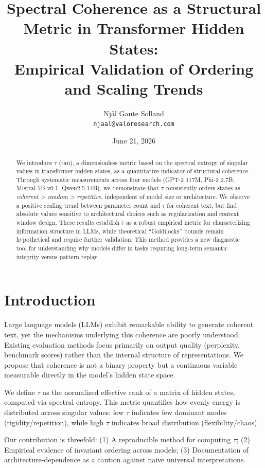\documentclass[10pt,a4paper]{article}
\title{Spectral Coherence as a Structural Metric in Transformer Hidden States: \\ Empirical Validation of Ordering and Scaling Trends}
\author{Njål Gaute Solland \\ \texttt{njaal@valoresearch.com}}
\date{June 21, 2026}
\begin{document}
\maketitle

\begin{abstract}
We introduce $\tau$ (tau), a dimensionless metric based on the spectral entropy of singular values in transformer hidden states, as a quantitative indicator of structural coherence. Through systematic measurements across four models (GPT-2 117M, Phi-2 2.7B, Mistral-7B v0.1, Qwen2.5-14B), we demonstrate that $\tau$ consistently orders states as \textit{coherent > random > repetitive}, independent of model size or architecture. We observe a positive scaling trend between parameter count and $\tau$ for coherent text, but find absolute values sensitive to architectural choices such as regularization and context window design. These results establish $\tau$ as a robust empirical metric for characterizing information structure in LLMs, while theoretical ``Goldilocks'' bounds remain hypothetical and require further validation. This method provides a new diagnostic tool for understanding why models differ in tasks requiring long-term semantic integrity versus pattern replay.
\end{abstract}

\section{Introduction}
Large language models (LLMs) exhibit remarkable ability to generate coherent text, yet the mechanisms underlying this coherence are poorly understood. Existing evaluation methods focus primarily on output quality (perplexity, benchmark scores) rather than the internal structure of representations. We propose that coherence is not a binary property but a continuous variable measurable directly in the model's hidden state space.

We define $\tau$ as the normalized effective rank of a matrix of hidden states, computed via spectral entropy. This metric quantifies how evenly energy is distributed across singular values: low $\tau$ indicates few dominant modes (rigidity/repetition), while high $\tau$ indicates broad distribution (flexibility/chaos).

Our contribution is threefold: (1) A reproducible method for computing $\tau$; (2) Empirical evidence of invariant ordering across models; (3) Documentation of architecture-dependence as a caution against naive universal interpretations.
\end{document}
